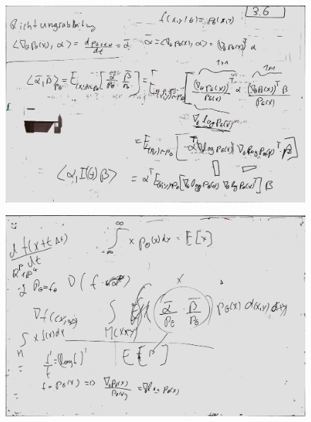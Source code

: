 \documentclass[a4paper]{article}
\begin{document}
\begin{figure}
	\centering
	\includegraphics[width=\textwidth]{whiteboard_notes/13.jpg}
\end{figure}

\begin{figure}
	\centering
	\includegraphics[width=\textwidth]{whiteboard_notes/14.jpg}
\end{figure}



\end{document}
